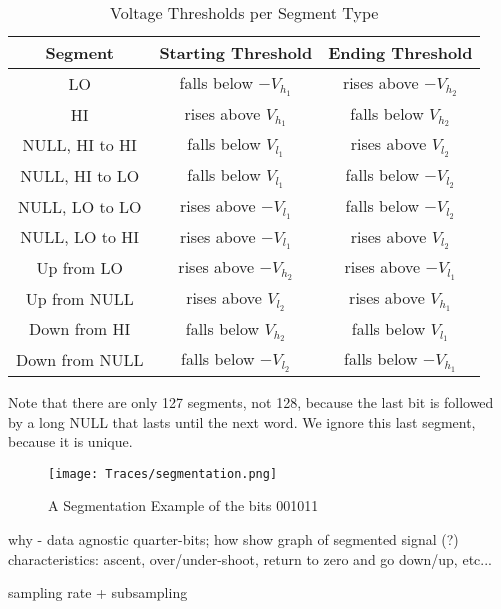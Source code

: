 \documentclass[conference]{IEEEtran}
\begin{document}
  \begin{table}
    \caption{Voltage Thresholds per Segment Type}
    \label{tab:SegmentationLevels}
    \centering
    \begin{tabular}{|c c c|} 
      \hline
      Segment & Starting Threshold & Ending Threshold \\ [0.5ex] 
      \hline\hline
      LO & falls below $-V_{h_1}$ & rises above $-V_{h_2}$ \\
      \hline
      HI & rises above $V_{h_1}$ & falls below $V_{h_2}$ \\
      \hline
      NULL, HI to HI & falls below $V_{l_1}$ & rises above $V_{l_2}$ \\
      \hline
      NULL, HI to LO & falls below $V_{l_1}$ & falls below $-V_{l_2}$ \\
      \hline
      NULL, LO to LO & rises above $-V_{l_1}$ & falls below $-V_{l_2}$ \\
      \hline
      NULL, LO to HI & rises above $-V_{l_1}$ & rises above $V_{l_2}$ \\
      \hline
      Up from LO & rises above $-V_{h_2}$ & rises above $-V_{l_1}$ \\
      \hline
      Up from NULL & rises above $V_{l_2}$ & rises above $V_{h_1}$ \\
      \hline
      Down from HI & falls below $V_{h_2}$ & falls below $V_{l_1}$ \\
      \hline
      Down from NULL & falls below $-V_{l_2}$ & falls below $-V_{h_1}$ \\
      \hline
    \end{tabular}
  \end{table}
  
  Note that there are only 127 segments, not 128, because the last bit is followed by a long NULL that lasts until the next word. We ignore this last segment, because it is unique.
  
  \begin{figure}[t]
    \centering
    \texttt{[image: Traces/segmentation.png]}
    \caption{A Segmentation Example of the bits 001011}
    \label{fig:SegmentationTrace}
  \end{figure}
  
  \color{gray}
  why - data agnostic
  quarter-bits; how
  show graph of segmented signal (?)
  characteristics: ascent, over/under-shoot, return to zero and go down/up,
  etc...

  sampling rate + subsampling
  \color{black}
  
\end{document}
